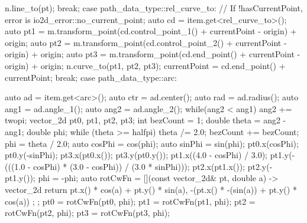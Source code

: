 \begin{codeblock}
{{{    n.line_to(pt);
  } break;
  case path_data_type::rel_curve_to:
  {
    // If !hasCurrentPoint, error is io2d_error::no_current_point;
    auto cd = item.get<rel_curve_to>();
    auto pt1 = m.transform_point(cd.control_point_1() + currentPoint -
      origin) + origin;
    auto pt2 = m.transform_point(cd.control_point_2() + currentPoint -
      origin) + origin;
    auto pt3 = m.transform_point(cd.end_point() + currentPoint - origin) +
      origin;
    n.curve_to(pt1, pt2, pt3);
    currentPoint = cd.end_point() + currentPoint;
  } break;
  case path_data_type::arc:
  {
    auto ad = item.get<arc>();
    auto ctr = ad.center();
    auto rad = ad.radius();
    auto ang1 = ad.angle_1();
    auto ang2 = ad.angle_2();
    while(ang2 < ang1) {
      ang2 += twopi;
    }
    vector_2d pt0, pt1, pt2, pt3;
    int bezCount = 1;
    double theta = ang2 - ang1;
    double phi;
    while (theta >= halfpi) {
      theta /= 2.0;
      bezCount += bezCount;
    }
    phi = theta / 2.0;
    auto cosPhi = cos(phi);
    auto sinPhi = sin(phi);
    pt0.x(cosPhi);
    pt0.y(-sinPhi);
    pt3.x(pt0.x());
    pt3.y(pt0.y());
    pt1.x((4.0 - cosPhi) / 3.0);
    pt1.y(-(((1.0 - cosPhi) * (3.0 - cosPhi)) / (3.0 * sinPhi)));
    pt2.x(pt1.x());
    pt2.y(-pt1.y());
    phi = -phi;
    auto rotCwFn = [](const vector_2d& pt, double a) -> vector_2d {
      return { pt.x() * cos(a) + pt.y() * sin(a),
        -(pt.x() * -(sin(a)) + pt.y() * cos(a)) };
    };
    pt0 = rotCwFn(pt0, phi);
    pt1 = rotCwFn(pt1, phi);
    pt2 = rotCwFn(pt2, phi);
    pt3 = rotCwFn(pt3, phi);
    
}}}
\end{codeblock}
